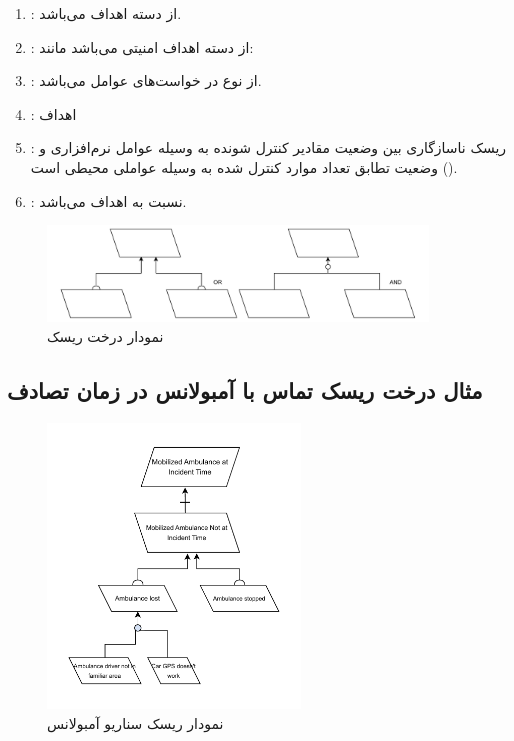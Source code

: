 \begin{enumerate}
    \item {}: از دسته اهداف  می‌باشد.
    \item {}: از دسته اهداف امنیتی می‌باشد مانند: 
    \item {}: از نوع در خواست‌های عوامل 
    می‌باشد.
    \item {}: اهداف 
    \item {}: ریسک ناسازگاری بین وضعیت مقادیر کنترل شونده به وسیله
    عوامل نرم‌افزاری و وضعیت تطابق تعداد موارد کنترل شده به وسیله عواملی محیطی
    است ().
    \item {}: نسبت به اهداف  می‌باشد.
\end{enumerate}

\begin{figure}[H]
    \centering
    \includegraphics[width=0.9\textwidth]{assets/risk_tree_or_and_re.drawio.pdf}
    \caption{نمودار درخت ریسک}
\end{figure}

\subsection{مثال درخت ریسک تماس با آمبولانس در زمان تصادف}

\begin{figure}[H]
    \centering
    \includegraphics[width=0.6\textwidth]{assets/ambulance_risk_diagram_example.drawio.pdf}
    \caption{نمودار ریسک سناریو آمبولانس}
\end{figure}

